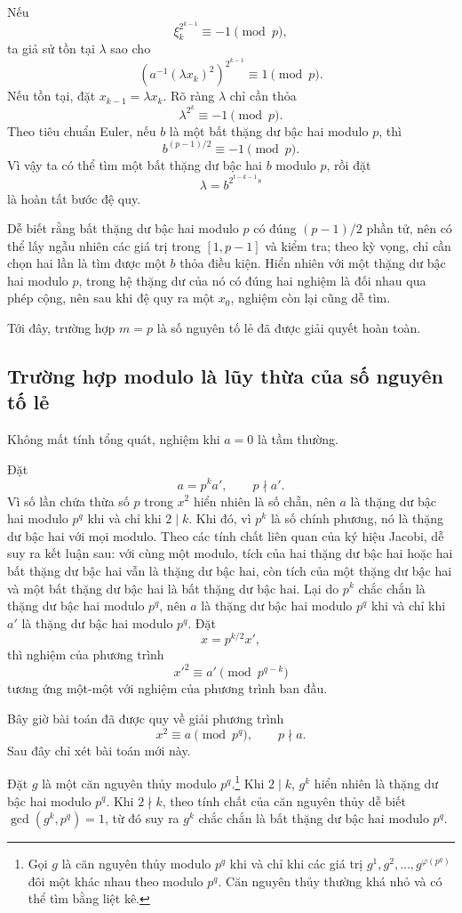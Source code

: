 \documentclass[11pt]{article}
\begin{document}
Nếu
\[
  \xi_k^{2^{k-1}}\equiv -1\pmod p,
\]
ta giả sử tồn tại $\lambda$ sao cho
\[
  \left(a^{-1}(\lambda x_k)^2\right)^{2^{k-1}}\equiv 1\pmod p.
\]
Nếu tồn tại, đặt $x_{k-1}=\lambda x_k$. Rõ ràng $\lambda$ chỉ cần thỏa
\[
  \lambda^{2^k}\equiv -1\pmod p.
\]
Theo tiêu chuẩn Euler, nếu $b$ là một bất thặng dư bậc hai modulo $p$, thì
\[
  b^{(p-1)/2}\equiv -1\pmod p.
\]
Vì vậy ta có thể tìm một bất thặng dư bậc hai $b$ modulo $p$, rồi đặt
\[
  \lambda=b^{2^{t-k-1}s}
\]
là hoàn tất bước đệ quy.

Dễ biết rằng bất thặng dư bậc hai modulo $p$ có đúng $(p-1)/2$ phần tử, nên
có thể lấy ngẫu nhiên các giá trị trong $[1,p-1]$ và kiểm tra; theo kỳ vọng,
chỉ cần chọn hai lần là tìm được một $b$ thỏa điều kiện. Hiển nhiên với một
thặng dư bậc hai modulo $p$, trong hệ thặng dư của nó có đúng hai nghiệm là
đối nhau qua phép cộng, nên sau khi đệ quy ra một $x_0$, nghiệm còn lại cũng
dễ tìm.

Tới đây, trường hợp $m=p$ là số nguyên tố lẻ đã được giải quyết hoàn toàn.

\subsection{Trường hợp modulo là lũy thừa của số nguyên tố lẻ}

Không mất tính tổng quát, nghiệm khi $a=0$ là tầm thường.

Đặt
\[
  a=p^k a',\qquad p\nmid a'.
\]
Vì số lần chứa thừa số $p$ trong $x^2$ hiển nhiên là số chẵn, nên $a$ là thặng
dư bậc hai modulo $p^q$ khi và chỉ khi $2\mid k$. Khi đó, vì $p^k$ là số
chính phương, nó là thặng dư bậc hai với mọi modulo. Theo các tính chất liên
quan của ký hiệu Jacobi, dễ suy ra kết luận sau: với cùng một modulo, tích của
hai thặng dư bậc hai hoặc hai bất thặng dư bậc hai vẫn là thặng dư bậc hai,
còn tích của một thặng dư bậc hai và một bất thặng dư bậc hai là bất thặng dư
bậc hai. Lại do $p^k$ chắc chắn là thặng dư bậc hai modulo $p^q$, nên $a$ là
thặng dư bậc hai modulo $p^q$ khi và chỉ khi $a'$ là thặng dư bậc hai modulo
$p^q$. Đặt
\[
  x=p^{k/2}x',
\]
thì nghiệm của phương trình
\[
  x'^2\equiv a'\pmod {p^{q-k}}
\]
tương ứng một-một với nghiệm của phương trình ban đầu.

Bây giờ bài toán đã được quy về giải phương trình
\[
  x^2\equiv a\pmod {p^q},\qquad p\nmid a.
\]
Sau đây chỉ xét bài toán mới này.

Đặt $g$ là một căn nguyên thủy modulo $p^q$.\footnote{Gọi $g$ là căn nguyên
thủy modulo $p^q$ khi và chỉ khi các giá trị
$g^1,g^2,\ldots,g^{\varphi(p^q)}$ đôi một khác nhau theo modulo $p^q$. Căn
nguyên thủy thường khá nhỏ và có thể tìm bằng liệt kê.} Khi $2\mid k$,
$g^k$ hiển nhiên là thặng dư bậc hai modulo $p^q$. Khi $2\nmid k$, theo tính
chất của căn nguyên thủy dễ biết $\gcd(g^k,p^q)=1$, từ đó suy ra $g^k$ chắc
chắn là bất thặng dư bậc hai modulo $p^q$.
\end{document}
